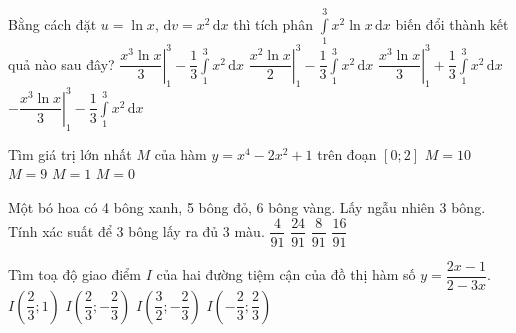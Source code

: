 \begin{ex}%
Bằng cách đặt $u=\ln x, \mathrm{\,d}v=x^2 \mathrm{\,d}x$ thì tích phân $\displaystyle \int \limits_1^3{x^2\ln x\mathrm{\,d}x}$ biến đổi thành kết quả nào sau đây?
\choice
{\True $\left. \dfrac{x^3\ln x}{3}\right|_1^3-\dfrac{1}{3}\displaystyle \int \limits_1^3{x^2\mathrm{\,d}x}$}
{$\left. \dfrac{x^2\ln x}{2}\right|_1^3-\dfrac{1}{3}\displaystyle \int \limits_1^3{x^2\mathrm{\,d}x}$}
{$\left. \dfrac{x^3\ln x}{3}\right|_1^3+\dfrac{1}{3}\displaystyle \int \limits_1^3{x^2\mathrm{\,d}x}$}
{$\left.-\dfrac{x^3\ln x}{3}\right|_1^3-\dfrac{1}{3}\displaystyle \int \limits_1^3{x^2\mathrm{\,d}x}$}
\end{ex}
\begin{ex}%
Tìm giá trị lớn nhất $M$ của hàm $y=x^4-2x^2+1$ trên đoạn $\left[0;2\right]$
\choice
{$M=10$}
{\True $M=9$}
{$M=1$}
{$M=0$}
\end{ex}
\begin{ex}%
Một bó hoa có 4 bông xanh, 5 bông đỏ, 6 bông vàng. Lấy ngẫu nhiên 3 bông. Tính xác suất để 3 bông lấy ra đủ 3 màu.
\choice
{$\dfrac{4}{91}$}
{\True $\dfrac{24}{91}$}
{$\dfrac{8}{91}$}
{$\dfrac{16}{91}$}
\end{ex}
\begin{ex}%
Tìm toạ độ giao điểm $I$ của hai đường tiệm cận của đồ thị hàm số $y=\dfrac{2x-1}{2-3x}.$
\choice
{$I\left(\dfrac{2}{3};1\right)$}
{\True $I\left(\dfrac{2}{3};-\dfrac{2}{3}\right)$}
{$I\left(\dfrac{3}{2};-\dfrac{2}{3}\right)$}
{$I\left(-\dfrac{2}{3};\dfrac{2}{3}\right)$}
\end{ex}
